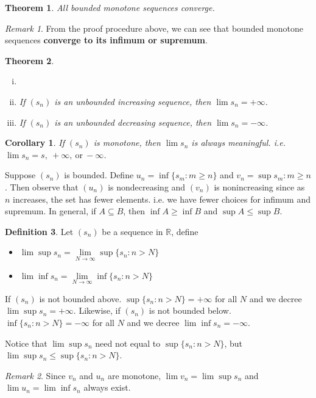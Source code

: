 \documentclass[12pt, lettersize]{book}
\theoremstyle{plain}
\newtheorem{thm}{Theorem}[section]
\newtheorem{cor}{Corollary}[thm]
\theoremstyle{definition}
\newtheorem{dfn}[thm]{Definition}
\theoremstyle{remark}
\newtheorem*{rem}{Remark}
\begin{document}
	\begin{thm}\label{def:bounded monotone seq}
		All bounded monotone sequences converge.
	\end{thm}
	\begin{rem}
		From the proof procedure above, we can see that bounded monotone sequences \textbf{converge to its infimum or supremum}.
	\end{rem}
	
	\begin{thm}\label{def:unbounded monotone seq}
		\begin{enumerate}[(i)]
			\item[]
			\item If $(s_n)$ is an unbounded increasing sequence, then $\lim s_n=+\infty$.
			\item If $(s_n)$ is an unbounded decreasing sequence, then $\lim s_n=-\infty$.
		\end{enumerate}
	\end{thm}
	\begin{cor}
		If $(s_n)$ is monotone, then $\lim s_n$ is always meaningful. i.e. $\lim s_n=s,\ +\infty,\ \text{or}\ -\infty$.
	\end{cor}
	
	Suppose $(s_n)$ is bounded. Define $u_n=\inf\{s_m: m\geq n\}$ and $v_n=\sup{s_m: m\geq n}$. Then observe that $(u_n)$ is nondecreasing and $(v_n)$ is nonincreasing since as $n$ increases, the set has fewer elements. i.e. we have fewer choices for infimum and supremum. In general, if $A\subseteq B$, then $\inf A\geq \inf B$ and $\sup A\leq \sup B$.
	
	\begin{dfn}
		Let $(s_n)$ be a sequence in $\mathbb{R}$, define
		\begin{itemize}
			\item $\lim\sup s_n=\lim\limits_{N\rightarrow\infty}\sup\{s_n: n>N\}$
			\item $\lim\inf s_n=\lim\limits_{N\rightarrow\infty}\inf\{s_n: n>N\}$
		\end{itemize}
	\end{dfn}
	If $(s_n)$ is not bounded above. $\sup\{s_n: n>N\}=+\infty$ for all $N$ and we decree $\lim\sup s_n=+\infty$.
	Likewise, if $(s_n)$ is not bounded below. $\inf\{s_n: n>N\}=-\infty$ for all $N$ and we decree $\lim\inf s_n=-\infty$.
	
	Notice that $\lim\sup s_n$ need not equal to $\sup\{s_n: n>N\}$, but $\lim\sup s_n\leq\sup\{s_n: n>N\}$.
	\begin{rem}
		Since $v_n$ and $u_n$ are monotone, $\lim v_n=\lim\sup s_n$ and $\lim u_n=\lim\inf s_n$ always exist.
	\end{rem}
	\newpage
	
\end{document}
